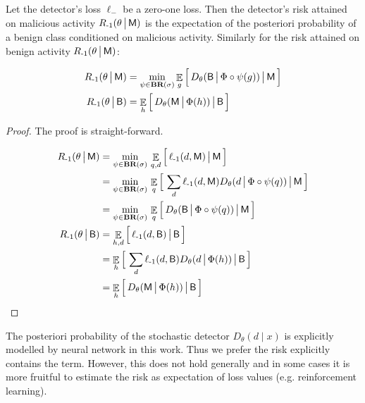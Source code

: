 \begin{proposition}\label{prop:ben_loss}
    Let the detector's loss $\ell_\minus$ be a zero-one loss. Then the detector's risk attained on malicious activity $R_{{\text{-}1}}(\theta \,\big|\, \mathsf{M})$ is the expectation of the posteriori probability of a benign class conditioned on malicious activity. Similarly for the risk attained on benign activity $R_{{\text{-}1}}(\theta \,\big|\, \mathsf{M})$:

    \begin{align*}
        R_{{\text{-}1}}(\theta \,\big|\, \mathsf{M}) &= \min_{\psi \in \textbf{BR}(\sigma)} \mathop{\mathbb{E}}_g \Big[\, D_\theta(\mathsf{B} \,\big|\, \Phi \circ \psi (g)) \,\big|\, \mathsf{M} \,\Big] \\
        R_{{\text{-}1}}(\theta \,\big|\, \mathsf{B}) &= \mathop{\mathbb{E}}_h \Big[\, D_\theta(\mathsf{M} \,\big|\, \Phi (h)) \,\big|\, \mathsf{B} \,\Big]
    \end{align*}
\end{proposition}

\begin{proof}
    The proof is straight-forward.

    \begin{align}
        R_{{\text{-}1}}(\theta \,\big|\, \mathsf{M}) &= \min_{\psi \in \textbf{BR}(\sigma) } \,
            \mathop{\mathbb{E}}_{q, d} \Big[\, \ell_{{\text{-}1}} (d, \mathsf{M}) \,\big|\, \mathsf{M} \,\Big] \\
           &= \min_{\psi \in \textbf{BR}(\sigma) } \,
               \mathop{\mathbb{E}}_q \Big[\, \sum_d \ell_{{\text{-}1}} (d, \mathsf{M}) D_\theta(d \,\big|\, \Phi \circ \psi(q)) \,\big|\, \mathsf{M} \,\Big] \\
           &= \min_{\psi \in \textbf{BR}(\sigma) } \,
               \mathop{\mathbb{E}}_q \Big[\, D_\theta(\mathsf{B} \,\big|\, \Phi \circ \psi(q)) \,\big|\, \mathsf{M} \,\Big] \\
        R_{{\text{-}1}}(\theta \,\big|\, \mathsf{B}) &= \mathop{\mathbb{E}}_{h, d} \Big[\, \ell_{{\text{-}1}} (d, \mathsf{B}) \,\big|\, \mathsf{B} \,\Big] \\
           &= \mathop{\mathbb{E}}_h \Big[\, \sum_d \ell_{{\text{-}1}} (d, \mathsf{B}) D_\theta(d \,\big|\, \Phi (h)) \,\big|\, \mathsf{B} \,\Big] \\
           &= \mathop{\mathbb{E}}_h \Big[\, D_\theta(\mathsf{M} \,\big|\, \Phi (h)) \,\big|\, \mathsf{B} \,\Big]
    \end{align}

\end{proof}

The posteriori probability of the stochastic detector $D_\theta(d \mid x)$ is explicitly modelled by neural network in this work. Thus we prefer the risk explicitly contains the term. However, this does not hold generally and in some cases it is more fruitful to estimate the risk as expectation of loss values (e.g. reinforcement learning).

